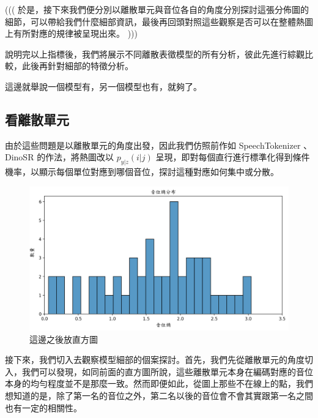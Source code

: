 {((( 於是，接下來我們便分別以離散單元與音位各自的角度分別探討這張分佈圖的細節，可以帶給我們什麼細部資訊，最後再回頭對照這些觀察是否可以在整體熱圖上有所對應的規律被呈現出來。 )))

        說明完以上指標後，我們將展示不同離散表徵模型的所有分析，彼此先進行綜觀比較，此後再針對細部的特徵分析。



{

        這邊就舉說一個模型有，另一個模型也有，就夠了。
}


\subsection{看離散單元}

        由於這些問題是以離散單元的角度出發，因此我們仿照前作如 SpeechTokenizer \cite{zhang2024speechtokenizer}、DinoSR \cite{liu2024dinosr} 的作法，將熱圖改以 $p_{y|z}(i|j)$ 呈現，即對每個直行進行標準化得到條件機率，以顯示每個單位對應到哪個音位，探討這種對應如何集中或分散。



{
\begin{figure}
    \centering
    \includegraphics[width=0.5\linewidth]{figures/0000000.png}
    \caption{這邊之後放直方圖}
    \label{fig:zhifangtu}
\end{figure}

  }
  

        接下來，我們切入去觀察模型細部的個案探討。首先，我們先從離散單元的角度切入，我們可以發現，如同前面的直方圖所說，這些離散單元本身在編碼對應的音位本身的均勻程度並不是那麼一致。然而即便如此，從圖上那些不在線上的點，我們想知道的是，除了第一名的音位之外，第二名以後的音位會不會其實跟第一名之間也有一定的相關性。

}
